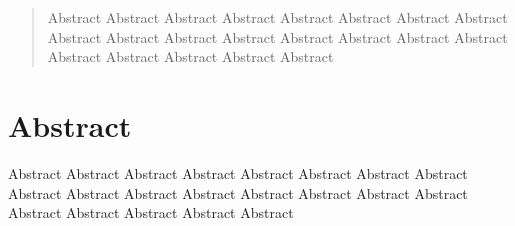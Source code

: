 \documentclass[10pt, sigconf, format=acmsmall, screen=true, review=false]{acmart}
\begin{document}
%

\pagebreak


\pagebreak
\footnotesize


\begin{abstract}
Abstract Abstract Abstract Abstract Abstract Abstract Abstract Abstract Abstract Abstract Abstract Abstract Abstract Abstract Abstract Abstract Abstract Abstract Abstract Abstract Abstract 
\end{abstract}





\twocolumn

\section*{Abstract}
Abstract Abstract Abstract Abstract Abstract Abstract Abstract Abstract Abstract Abstract Abstract Abstract Abstract Abstract Abstract Abstract Abstract Abstract Abstract Abstract Abstract 
\end{document}
